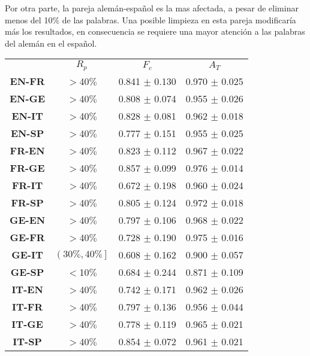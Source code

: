 Por otra parte, la pareja alemán-español es la mas afectada, a pesar de eliminar menos del 10$\%$ de las palabras. Una posible limpieza en esta pareja modificaría más los resultados, en consecuencia se requiere una mayor atención a las palabras
del alemán en el español. 

\begin{table}[]
	\centering
	\begin{tabular}{cccc}
	          & \textbf{$R_{p}$} & \textbf{$F_{c}$} & \textbf{$A_{T}$} \\[2pt]
		\textbf{EN-FR} & $>$40$\%$  & 0.841 $\pm$ 0.130 &  0.970 $\pm$ 0.025 \\
		\textbf{EN-GE} & $>$40$\%$  & 0.808 $\pm$ 0.074 &  0.955 $\pm$ 0.026 \\
		\textbf{EN-IT} & $>$40$\%$  & 0.828 $\pm$ 0.081 &  0.962 $\pm$ 0.018 \\ 
		\textbf{EN-SP} & $>$40$\%$  & 0.777 $\pm$ 0.151 &  0.955 $\pm$ 0.025 \\[5pt]
		
		\textbf{FR-EN} & $>$40$\%$  & 0.823 $\pm$ 0.112 &  0.967 $\pm$ 0.022 \\
		\rowcolor{bueno}\textbf{FR-GE} & $>$40$\%$  & 0.857 $\pm$ 0.099 &  0.976 $\pm$ 0.014 \\
		\textbf{FR-IT} & $>$40$\%$  & 0.672 $\pm$ 0.198 &  0.960 $\pm$ 0.024 \\ 
		\textbf{FR-SP} & $>$40$\%$  & 0.805 $\pm$ 0.124 &  0.972 $\pm$ 0.018 \\[5pt]
		
		\textbf{GE-EN} & $>$40$\%$  & 0.797 $\pm$ 0.106 &  0.968 $\pm$ 0.022 \\
		\textbf{GE-FR} & $>$40$\%$  & 0.728 $\pm$ 0.190 &  0.975 $\pm$ 0.016 \\
		\textbf{GE-IT} & $\left( 30\%, 40\% \right]$  & 0.608 $\pm$ 0.162 &  0.900 $\pm$ 0.057 \\
		\rowcolor{malo}\textbf{GE-SP} & $<$10$\%$  & 0.684 $\pm$ 0.244 &  0.871 $\pm$ 0.109 \\
		[5pt]
		
		\textbf{IT-EN} & $>$40$\%$  & 0.742 $\pm$ 0.171 &  0.962 $\pm$ 0.026 \\
		\textbf{IT-FR} & $>$40$\%$  & 0.797 $\pm$ 0.136 &  0.956 $\pm$ 0.044 \\
		\textbf{IT-GE} & $>$40$\%$  & 0.778 $\pm$ 0.119 &  0.965 $\pm$ 0.021 \\
		\textbf{IT-SP} & $>$40$\%$  & 0.854 $\pm$ 0.072 &  0.961 $\pm$ 0.021 \\[5pt]
		

\end{tabular}
\end{table}
